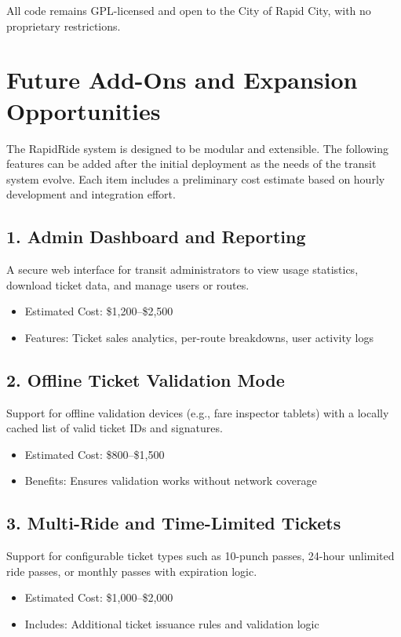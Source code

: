 \documentclass[12pt]{article}
\begin{document}
All code remains GPL-licensed and open to the City of Rapid City, with no proprietary restrictions.

\section{Future Add-Ons and Expansion Opportunities}

The RapidRide system is designed to be modular and extensible. The following features can be added after the initial deployment as the needs of the transit system evolve. Each item includes a preliminary cost estimate based on hourly development and integration effort.

\subsection*{1. Admin Dashboard and Reporting}
A secure web interface for transit administrators to view usage statistics, download ticket data, and manage users or routes.
\begin{itemize}
    \item Estimated Cost: \$1,200–\$2,500
    \item Features: Ticket sales analytics, per-route breakdowns, user activity logs
\end{itemize}

\subsection*{2. Offline Ticket Validation Mode}
Support for offline validation devices (e.g., fare inspector tablets) with a locally cached list of valid ticket IDs and signatures.
\begin{itemize}
    \item Estimated Cost: \$800–\$1,500
    \item Benefits: Ensures validation works without network coverage
\end{itemize}

\subsection*{3. Multi-Ride and Time-Limited Tickets}
Support for configurable ticket types such as 10-punch passes, 24-hour unlimited ride passes, or monthly passes with expiration logic.
\begin{itemize}
    \item Estimated Cost: \$1,000–\$2,000
    \item Includes: Additional ticket issuance rules and validation logic
\end{itemize}
\end{document}
